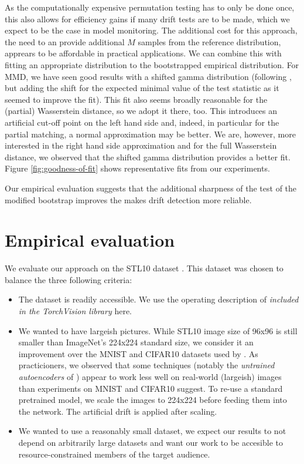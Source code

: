 \documentclass[a4paper,twoside,10pt]{article}
\theoremstyle{plain}
\theoremstyle{remark}
\begin{document}
As the computationally expensive permutation testing has to only be done once, this also allows for efficiency gains if many drift tests are to be made, which we expect to be the case in model monitoring.
The additional cost for this approach, the need to an provide additional $M$ samples from the reference distribution, apprears to be affordable in practical applications. We can combine this with fitting an appropriate distribution to the bootstrapped empirical distribution. For MMD, we have seen good results with a shifted gamma distribution (following \cite{Gretton}, but adding the shift for the expected minimal value of the test statistic as it seemed to improve the fit).
This fit also seems broadly reasonable for the (partial) Wasserstein distance, so we adopt it there, too. This introduces an artificial cut-off point on the left hand side and, indeed, in particular for the partial matching, a normal approximation may be better. We are, however, more interested in the right hand side approximation and for the
full Wasserstein distance, we observed that the shifted gamma distribution provides a better fit. Figure \ref{fig:goodness-of-fit} shows representative fits from our experiments.

Our empirical evaluation suggests that the additional sharpness of the test of the modified bootstrap improves the makes drift detection more reliable.


\section{Empirical evaluation}
\label{sec:experiment}

We evaluate our approach on the STL10 dataset \cite{STL10}. This dataset was chosen to balance the three following criteria:


\begin{itemize}
\item The dataset is readily accessible. We use the operating description of \textit{included in the TorchVision library} here.
\item We wanted to have largeish pictures. While STL10 image size of 96x96 is still smaller than ImageNet's 224x224 standard size, we consider it an improvement over the MNIST and CIFAR10 datasets used by \cite{FailingLoudly}.
As practicioners, we observed that some techniques (notably the \textit{untrained autoencoders} of \cite{FailingLoudly}) appear to work less well on real-world (largeish) images than experiments on MNIST and CIFAR10 suggest. To re-use a standard pretrained model, we scale the images to 224x224 before feeding them into the network. The artificial drift is applied after scaling.
\item We wanted to use a reasonably small dataset, we expect our results to not depend on arbitrarily large datasets and want our work to be accesible to resource-constrained members of the target audience.
\end{itemize}
\end{document}
